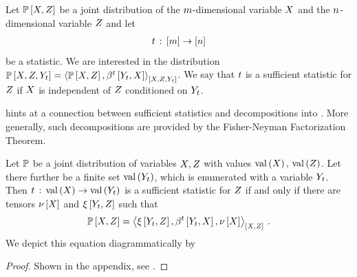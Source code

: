 \begin{definition}
    \label{def:sufStatistic}
    Let $\mathbb{P}\left[X,Z\right]$ be a joint distribution of the $m$-dimensional variable $X$ and the $n$-dimensional variable $Z$ and let
    \begin{align*}
        t \,:\, [m] \rightarrow [n]
    \end{align*}
    be a statistic.
    We are interested in the distribution $\probat{\catvariable,\thirdcatvariable,\headvariableof{\sstat}}=\contractionof{\probat{\catvariable,\thirdcatvariable},\bencodingofat{\sstat}{\headvariableof{\sstat},\catvariable}}{\catvariable,\thirdcatvariable,\headvariableof{\sstat}}$.
    We say that $t$ is a sufficient statistic for $Z$ if $X$ is independent of $Z$ conditioned on $Y_{t}$.
\end{definition}



 hints at a connection between sufficient statistics and decompositions into \CompActNets{}.
More generally, such decompositions are provided by the Fisher-Neyman Factorization Theorem.

\begin{theorem} %
    \label{the:factorizationFisherNeyman}
    Let $\mathbb{P}$ be a joint distribution of variables $X,Z$ with values $\mathrm{val}\left(X\right),\,\mathrm{val}\left(Z\right)$.
    Let there further be a finite set $\mathrm{val}\left(Y_{t}\right)$, which is enumerated with a variable $Y_{t}$.
    Then $t\,:\, \mathrm{val}\left(X\right) \rightarrow \mathrm{val}\left(Y_{t}\right)$ is a sufficient statistic for $Z$ if and only if there are tensors $\nu\left[X\right]$ and $\xi\left[Y_{t},Z\right]$ such that
    \begin{align*}
        \probat{\catvariable,\thirdcatvariable}
        = \contractionof{
            \acttensorat{\headvariableof{\sstat},\thirdcatvariable},\bencodingofat{\sstat}{\headvariableof{\sstat},\catvariable},\basemeasureat{\catvariable}
        }{\catvariable,\thirdcatvariable} \, .
    \end{align*}
    We depict this equation diagrammatically by
    \begin{center}
        
    \end{center}
\end{theorem}
\begin{proof}
    Shown in the appendix, see .
\end{proof}

